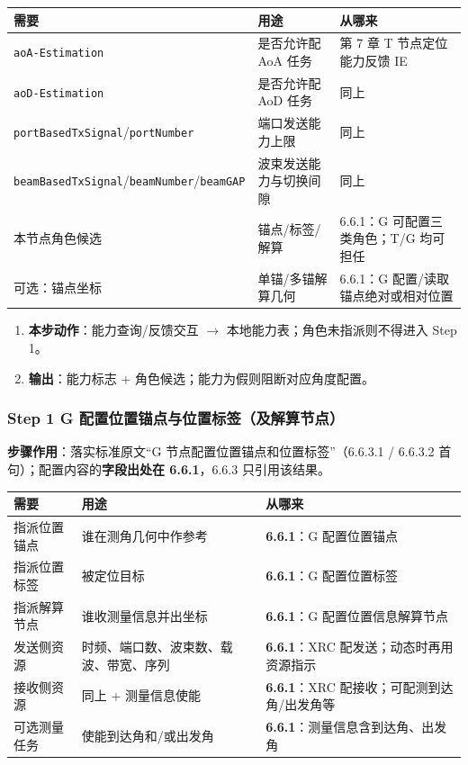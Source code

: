 \documentclass[11pt,a4paper]{ctexart}
\begin{document}
\begin{table}[h]
\centering
\small
\begin{tabular}{L{3.2cm}L{5.0cm}L{4.8cm}}
\toprule
\textbf{需要} & \textbf{用途} & \textbf{从哪来} \\
\midrule
\texttt{aoA-Estimation} & 是否允许配 AoA 任务 & 第 7 章 T 节点定位能力反馈 IE \\
\texttt{aoD-Estimation} & 是否允许配 AoD 任务 & 同上 \\
\texttt{portBasedTxSignal}/\texttt{portNumber} & 端口发送能力上限 & 同上 \\
\texttt{beamBasedTxSignal}/\texttt{beamNumber}/\texttt{beamGAP} & 波束发送能力与切换间隙 & 同上 \\
本节点角色候选 & 锚点/标签/解算 & 6.6.1：G 可配置三类角色；T/G 均可担任 \\
可选：锚点坐标 & 单锚/多锚解算几何 & 6.6.1：G 配置/读取锚点绝对或相对位置 \\
\bottomrule
\end{tabular}
\end{table}

\begin{enumerate}[nosep]
  \item \textbf{本步动作}：能力查询/反馈交互 $\rightarrow$ 本地能力表；角色未指派则不得进入 Step 1。
  \item \textbf{输出}：能力标志 + 角色候选；能力为假则阻断对应角度配置。
\end{enumerate}

\subsubsection{Step 1 G 配置位置锚点与位置标签（及解算节点）}

\textbf{步骤作用}：落实标准原文``G 节点配置位置锚点和位置标签''（6.6.3.1 / 6.6.3.2 首句）；配置内容的\textbf{字段出处在 6.6.1}，6.6.3 只引用该结果。

\begin{table}[h]
\centering
\small
\begin{tabular}{L{3.5cm}L{4.8cm}L{4.7cm}}
\toprule
\textbf{需要} & \textbf{用途} & \textbf{从哪来} \\
\midrule
指派位置锚点 & 谁在测角几何中作参考 & \textbf{6.6.1}：G 配置位置锚点 \\
指派位置标签 & 被定位目标 & \textbf{6.6.1}：G 配置位置标签 \\
指派解算节点 & 谁收测量信息并出坐标 & \textbf{6.6.1}：G 配置位置信息解算节点 \\
发送侧资源 & 时频、端口数、波束数、载波、带宽、序列 & \textbf{6.6.1}：XRC 配发送；动态时再用资源指示 \\
接收侧资源 & 同上 + 测量信息使能 & \textbf{6.6.1}：XRC 配接收；可配测到达角/出发角等 \\
可选测量任务 & 使能到达角和/或出发角 & \textbf{6.6.1}：测量信息含到达角、出发角 \\
\bottomrule
\end{tabular}
\end{table}
\end{document}
